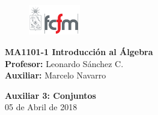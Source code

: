 \documentclass[letterpaper,11pt]{article}
\theoremstyle{plain}
\begin{document}
\newpage
\pagestyle{fancy}
\fancyhf{}

\begin{figure} %
    \vspace{-5mm}
    \includegraphics[width=0.2\textwidth]{img/fcfm2.png}
\end{figure}


\noindent
\textbf{MA1101-1 Introducción al Álgebra}\\
\textbf{Profesor: }Leonardo Sánchez C.\\
\textbf{Auxiliar: }Marcelo Navarro

\begin{center}
{\bf \Large Auxiliar 3: Conjuntos}\\
{05 de Abril de 2018}
\end{center}
\end{document}
